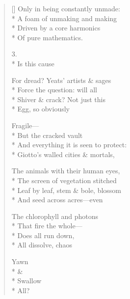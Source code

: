 \begin{verse}[\versewidth]
Only in being constantly unmade:\\*
A foam of unmaking and making\\*
Driven by a core harmonics\\*
Of pure mathematics.

3.\\*
\hspace{3\vgap}  Is this cause

For dread? Yeats' artists \& sages\\*
Force the question: will all\\*
Shiver \& crack?  Not just this \\*
Egg, so obviously

Fragile---\\*
But the cracked vault\\*
And everything it is seen to protect:\\*
Giotto's walled cities \& mortals,

The animals with their human eyes,\\*
The screen of vegetation stitched\\*
Leaf by leaf, stem \& bole, blossom\\*
And seed across acres---even 

The chlorophyll and photons\\*
That fire the whole---\\*
Does all run down,\\*
All dissolve, chaos

Yawn\\*
\& \\*
Swallow\\*
All?
\end{verse}
